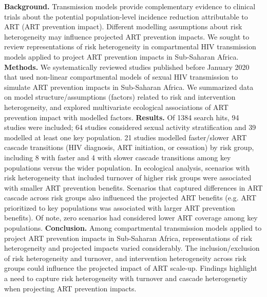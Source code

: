 \textbf{Background.}
Transmission models provide complementary evidence to clinical trials about
the potential population-level incidence reduction attributable to ART (ART prevention impact).
Different modelling assumptions about risk heterogeneity may influence projected ART prevention impacts.
We sought to review representations of risk heterogeneity in compartmental HIV transmission models
applied to project ART prevention impacts in Sub-Saharan Africa.
\textbf{Methods.}
We systematically reviewed studies published before January 2020 that used
non-linear compartmental models of sexual HIV transmission
to simulate ART prevention impacts in Sub-Saharan Africa.
We summarized data on model structure/assumptions (factors) related to risk and intervention heterogeneity,
and explored multivariate ecological associations of ART prevention impact with modelled factors.
\textbf{Results.}
Of 1384 search hits, 94 studies were included;
64 studies considered sexual activity stratification and 39 modelled at least one key population.
21 studies modelled faster/slower ART cascade transitions (HIV diagnosis, ART initiation, or cessation) by risk group,
including 8 with faster and 4 with slower cascade transitions among key populations versus the wider population.
In ecological analysis, scenarios with risk heterogeneity that included turnover of higher risk groups
were associated with smaller ART prevention benefits. Scenarios that captured differences in ART cascade across risk groups also influenced the projected ART benefits (e.g. 
ART prioritized to key populations was associated with larger ART prevention benefits). %
Of note, zero scenarios had considered lower ART coverage among key populations. %
\textbf{Conclusion.}
Among compartmental transmission models applied to project ART prevention impacts in Sub-Saharan Africa,
representations of risk heterogeneity and projected impacts varied considerably. The inclusion/exclusion of risk heterogeneity and turnover, and intervention heterogeneity across risk groups could influence the projected impact of ART scale-up. %
Findings highlight a need to capture risk heterogeneity with turnover and 
cascade heterogenetiy when projecting ART prevention impacts.